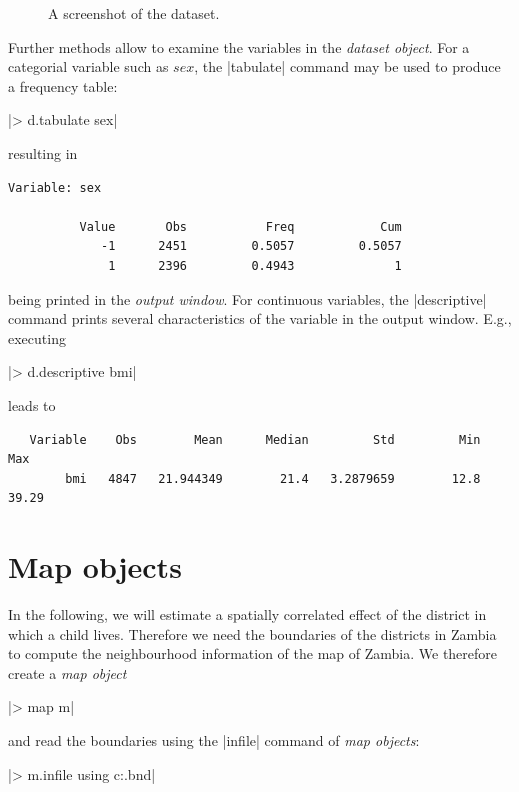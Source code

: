 \vspace{2cm}

\begin{figure}
\begin{center}
 {\it\caption{A
screenshot of the dataset.\label{step:screenshot}}}
\end{center}
\end{figure}

Further methods allow to examine the variables in the {\it dataset object}. For a categorial variable such as $\mathit{sex}$,
the |tabulate| command may be used to produce a frequency table:

|> d.tabulate sex|

resulting in

\begin{verbatim}
Variable: sex

          Value       Obs           Freq            Cum
             -1      2451         0.5057         0.5057
              1      2396         0.4943              1
\end{verbatim}

being printed in the {\it output window}. For continuous variables,  the |descriptive| command prints several characteristics
of the variable in the {output window}. E.g., executing

|> d.descriptive bmi|

leads to

\begin{verbatim}
   Variable    Obs        Mean      Median         Std         Min         Max
        bmi   4847   21.944349        21.4   3.2879659        12.8       39.29
\end{verbatim}

\section{Map objects}\label{step:maps}

In the following, we will estimate a spatially correlated effect of the district in which a child lives. Therefore we need the
boundaries of the districts in Zambia to compute the neighbourhood information of the map of Zambia. We therefore create a {\it
map object}

|> map m|

and read the boundaries using the |infile| command of {\it map objects}:

|> m.infile using c:\data\zambia.bnd|

